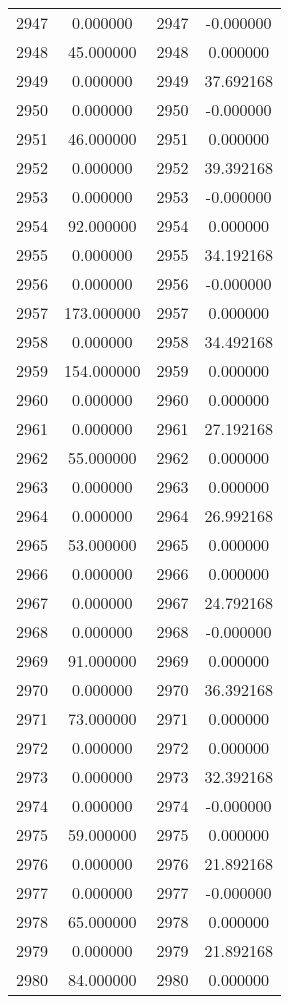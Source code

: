 \documentclass[12pt]{article}
\begin{document}
\begin{longtable}{@{}cccc@{}}
2947 & 0.000000 & 2947 & -0.000000 \\
2948 & 45.000000 & 2948 & 0.000000 \\
2949 & 0.000000 & 2949 & 37.692168 \\
2950 & 0.000000 & 2950 & -0.000000 \\
2951 & 46.000000 & 2951 & 0.000000 \\
2952 & 0.000000 & 2952 & 39.392168 \\
2953 & 0.000000 & 2953 & -0.000000 \\
2954 & 92.000000 & 2954 & 0.000000 \\
2955 & 0.000000 & 2955 & 34.192168 \\
2956 & 0.000000 & 2956 & -0.000000 \\
2957 & 173.000000 & 2957 & 0.000000 \\
2958 & 0.000000 & 2958 & 34.492168 \\
2959 & 154.000000 & 2959 & 0.000000 \\
2960 & 0.000000 & 2960 & 0.000000 \\
2961 & 0.000000 & 2961 & 27.192168 \\
2962 & 55.000000 & 2962 & 0.000000 \\
2963 & 0.000000 & 2963 & 0.000000 \\
2964 & 0.000000 & 2964 & 26.992168 \\
2965 & 53.000000 & 2965 & 0.000000 \\
2966 & 0.000000 & 2966 & 0.000000 \\
2967 & 0.000000 & 2967 & 24.792168 \\
2968 & 0.000000 & 2968 & -0.000000 \\
2969 & 91.000000 & 2969 & 0.000000 \\
2970 & 0.000000 & 2970 & 36.392168 \\
2971 & 73.000000 & 2971 & 0.000000 \\
2972 & 0.000000 & 2972 & 0.000000 \\
2973 & 0.000000 & 2973 & 32.392168 \\
2974 & 0.000000 & 2974 & -0.000000 \\
2975 & 59.000000 & 2975 & 0.000000 \\
2976 & 0.000000 & 2976 & 21.892168 \\
2977 & 0.000000 & 2977 & -0.000000 \\
2978 & 65.000000 & 2978 & 0.000000 \\
2979 & 0.000000 & 2979 & 21.892168 \\
2980 & 84.000000 & 2980 & 0.000000 \\

\end{longtable}
\end{document}
